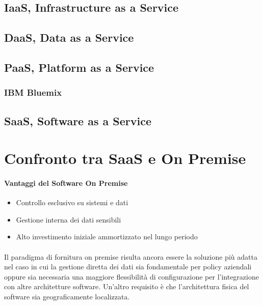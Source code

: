 \subsection{IaaS, Infrastructure as a Service}
\subsection{DaaS, Data as a Service}
\subsection{PaaS, Platform as a Service}
\subsubsection{IBM Bluemix}
\subsection{SaaS, Software as a Service}

\section{Confronto tra SaaS e On Premise}
\paragraph{Vantaggi del Software On Premise}
\begin{itemize}
	\item  Controllo esclusivo su sistemi e dati
	\item Gestione interna dei dati sensibili
	\item Alto investimento iniziale ammortizzato nel lungo periodo
\end{itemize}

\paragraph{}
Il paradigma di fornitura on premise risulta ancora essere la soluzione più adatta nel caso in cui la gestione diretta dei dati sia fondamentale per policy aziendali oppure sia necessaria una maggiore flessibilità di configurazione per l’integrazione con altre architetture software. Un'altro requisito è che l'architettura fisica del software sia geograficamente localizzata.
